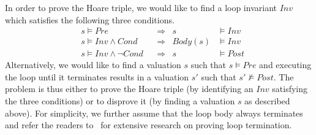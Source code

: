 In order to prove the Hoare triple, we would like to find a loop invariant $\mathit{Inv}$ which satisfies the following three conditions.
\begin{align}
    &s \models \mathit{Pre}
        &&\Longrightarrow & s &\models \mathit{Inv} \label{inv:pre} \\
    &s \models \mathit{Inv} \wedge \mathit{Cond}
        &&\Longrightarrow & \mathit{Body}(s) &\models \mathit{Inv} \label{inv:loop} \\
    &s \models \mathit{Inv} \wedge \neg \mathit{Cond}
        &&\Longrightarrow & s &\models \mathit{Post} \label{inv:post}
\end{align}
Alternatively, we would like to find a valuation $s$ such that $s \models \mathit{Pre}$ and executing the loop until it terminates results in a valuation $s'$ such that $s' \not \models \mathit{Post}$.
The problem is thus either to prove the Hoare triple (by identifying an $\mathit{Inv}$ satisfying the three conditions) or to disprove it (by finding a valuation $s$ as described above). For simplicity, we further assume that the loop body always terminates and refer the readers to~\cite{Domagoj:FAC:2013,LeQC:PLDI:15,Hong:ASE:2015} %
for extensive research on proving loop termination.

